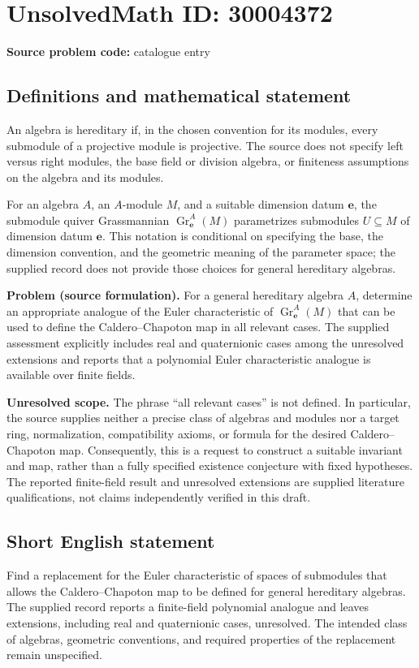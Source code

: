 \documentclass[11pt]{article}
\begin{document}
\section*{UnsolvedMath ID: 30004372}
\textbf{Source problem code:} catalogue entry
\subsection{Definitions and mathematical statement}
An algebra is hereditary if, in the chosen convention for its modules, every submodule of a projective module is projective. The source does not specify left versus right modules, the base field or division algebra, or finiteness assumptions on the algebra and its modules.

For an algebra \(A\), an \(A\)-module \(M\), and a suitable dimension datum \(\mathbf e\), the submodule quiver Grassmannian \(\operatorname{Gr}^{A}_{\mathbf e}(M)\) parametrizes submodules \(U\subseteq M\) of dimension datum \(\mathbf e\). This notation is conditional on specifying the base, the dimension convention, and the geometric meaning of the parameter space; the supplied record does not provide those choices for general hereditary algebras.

\textbf{Problem (source formulation).} For a general hereditary algebra \(A\), determine an appropriate analogue of the Euler characteristic of \(\operatorname{Gr}^{A}_{\mathbf e}(M)\) that can be used to define the Caldero--Chapoton map in all relevant cases. The supplied assessment explicitly includes real and quaternionic cases among the unresolved extensions and reports that a polynomial Euler characteristic analogue is available over finite fields.

\textbf{Unresolved scope.} The phrase ``all relevant cases'' is not defined. In particular, the source supplies neither a precise class of algebras and modules nor a target ring, normalization, compatibility axioms, or formula for the desired Caldero--Chapoton map. Consequently, this is a request to construct a suitable invariant and map, rather than a fully specified existence conjecture with fixed hypotheses. The reported finite-field result and unresolved extensions are supplied literature qualifications, not claims independently verified in this draft.
\subsection{Short English statement}
Find a replacement for the Euler characteristic of spaces of submodules that allows the Caldero--Chapoton map to be defined for general hereditary algebras. The supplied record reports a finite-field polynomial analogue and leaves extensions, including real and quaternionic cases, unresolved. The intended class of algebras, geometric conventions, and required properties of the replacement remain unspecified.
\end{document}
